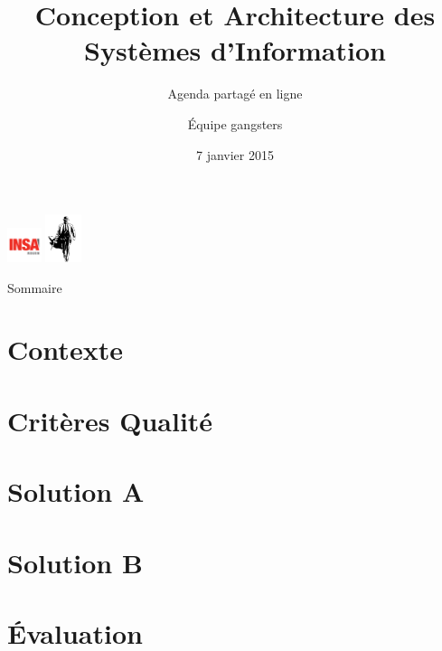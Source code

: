 \documentclass[9pt,table]{beamer}
\title{Conception et Architecture des Systèmes d'Information}
\subtitle{Agenda partagé en ligne}
\author{Équipe gangsters}
\date{7 janvier 2015}
\begin{document}
\begin{frame}[plain]
	\titlepage
	\begin{center}
		\includegraphics[height=10mm]{images/logoInsa} \hspace{0.5cm}
		\includegraphics[height=14mm]{images/logoGangsters} \hspace{0.5cm}
	\end{center}
\end{frame}

\begin{frame}{Sommaire}
	 \vspace{1cm}
	 \tableofcontents
\end{frame}
\section{Contexte}


\section{Critères Qualité}


\section{Solution A}


\section{Solution B}


\section{\'Evaluation}

\end{document}
